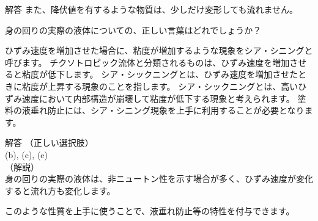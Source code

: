 \documentclass[uplatex,dvipdfmx,a4paper,11pt]{jsarticle}
\begin{document}
\begin{qlist}
\begin{itembox}[l]{解答}
            また、降伏値を有するような物質は、少しだけ変形しても流れません。
        \end{itembox}
	\qitem 身の回りの実際の液体についての、正しい言葉はどれでしょうか？
		\begin{qlist2}
			\qitem ひずみ速度を増加させた場合に、粘度が増加するような現象をシア・シニングと呼びます。
			\qitem チクソトロピック流体と分類されるものは、ひずみ速度を増加させると粘度が低下します。
			\qitem シア・シックニングとは、ひずみ速度を増加させたときに粘度が上昇する現象のことを指します。
			\qitem シア・シックニングとは、高いひずみ速度において内部構造が崩壊して粘度が低下する現象と考えられます。
			\qitem 塗料の液垂れ防止には、シア・シニング現象を上手に利用することが必要となります。
		\end{qlist2}
		\vspace{3mm}
        \begin{itembox}[l]{解答}
            （正しい選択肢）\\
            (b), (c), (e)\\
            （解説）\\
            身の回りの実際の液体は、非ニュートン性を示す場合が多く、ひずみ速度が変化すると流れ方も変化します。
            
            このような性質を上手に使うことで、液垂れ防止等の特性を付与できます。    
        \end{itembox}
\end{qlist}
\end{document}

